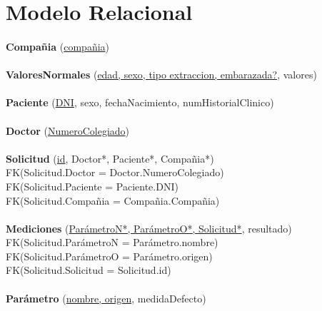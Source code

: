 \documentclass[a4paper,10pt]{article}
\newcommand\tab[1][1cm]{\hspace*{#1}}
\begin{document}
\section{Modelo Relacional}

\paragraph{}
{\bf Compañia} (\underline{compañia})

\paragraph{}
{\bf ValoresNormales} (\underline{edad, sexo, tipo extraccion, embarazada?}, valores)

\paragraph{}
{\bf Paciente} (\underline{DNI}, sexo, fechaNacimiento, numHistorialClinico)

\paragraph{}
{\bf Doctor} (\underline{NumeroColegiado})

\paragraph{}
{\bf Solicitud} (\underline{id}, Doctor*, Paciente*, Compañia*)\\
\tab FK(Solicitud.Doctor = Doctor.NumeroColegiado)\\
\tab FK(Solicitud.Paciente = Paciente.DNI)\\
\tab FK(Solicitud.Compañia = Compañia.Compañia)

\paragraph{}
{\bf Mediciones} (\underline{ParámetroN*, ParámetroO*, Solicitud*}, resultado)\\
\tab FK(Solicitud.ParámetroN = Parámetro.nombre)\\
\tab FK(Solicitud.ParámetroO = Parámetro.origen)\\
\tab FK(Solicitud.Solicitud = Solicitud.id)

\paragraph{}
{\bf Parámetro} (\underline{nombre, origen}, medidaDefecto)
\end{document}
